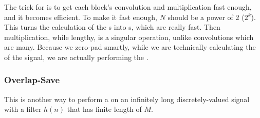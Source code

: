 The trick for  is to get each block's convolution and multiplication fast enough, and it becomes efficient.
To make it fast enough, $N$ should be a power of 2 ($2^{k}$).
This turns the calculation of the s into s, which are really fast.
Then multiplication, while lengthy, is a singular operation, unlike convolutions which are many.
Because we zero-pad smartly, while we are technically calculating the  of the signal, we are actually performing the .

\subsubsection{Overlap-Save}\label{subsubsec:DFT_Application-Overlap_Save}
This is another way to perform a  on an infinitely long discretely-valued signal with a filter $h(n)$ that has finite length of $M$.

